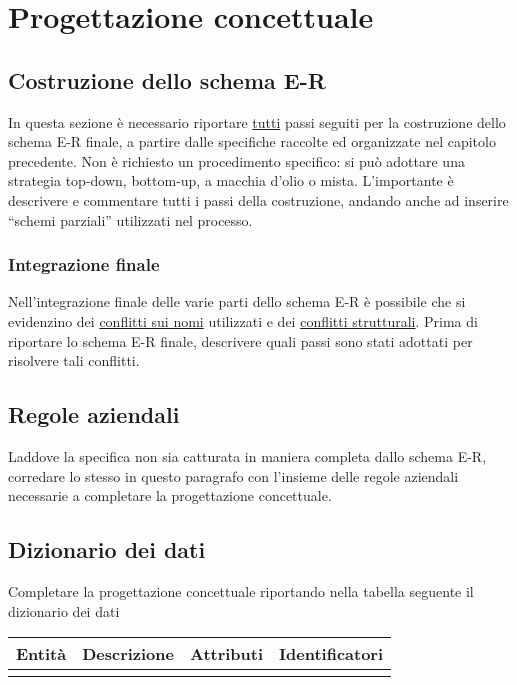 \section{Progettazione concettuale}
\subsection*{Costruzione dello schema E-R}

\begin{templateblock}
    In questa sezione è necessario riportare \underline{tutti} passi seguiti
    per la costruzione dello schema E-R finale, a partire dalle specifiche
    raccolte ed organizzate nel capitolo precedente.
    Non è richiesto un procedimento specifico: si può adottare una strategia
    top-down, bottom-up, a macchia d’olio o mista.
    L’importante è descrivere e commentare tutti i passi della costruzione,
    andando anche ad inserire “schemi parziali” utilizzati nel processo.
\end{templateblock}

\subsubsection*{Integrazione finale}

\begin{templateblock}
    Nell’integrazione finale delle varie parti dello schema E-R è possibile
    che si evidenzino dei \underline{conflitti sui nomi} utilizzati e dei
    \underline{conflitti strutturali}.
    Prima di riportare lo schema E-R finale, descrivere quali passi sono stati
    adottati per risolvere tali conflitti.
\end{templateblock}

\subsection*{Regole aziendali}

\begin{templateblock}
    Laddove la specifica non sia catturata in maniera completa dallo schema E-R,
    corredare lo stesso in questo paragrafo con l’insieme delle regole
    aziendali necessarie a completare la progettazione concettuale.
\end{templateblock}

\subsection*{Dizionario dei dati}

\begin{templateblock}
    Completare la progettazione concettuale riportando nella tabella seguente
    il dizionario dei dati
\end{templateblock}

\begin{tabularx}{\linewidth}{|c|Y|c|c|}
    \hline
    \textbf{Entità} & \textbf{Descrizione} & \textbf{Attributi} & \textbf{Identificatori} \\\hline
                    &                      &                    &                         \\ \hline
\end{tabularx}
